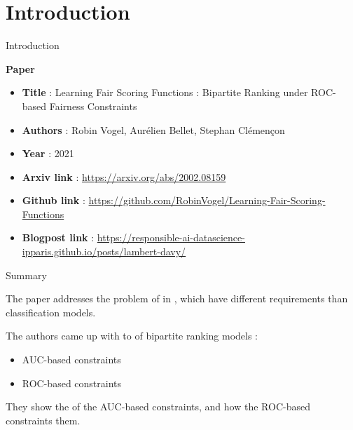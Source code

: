 \section{Introduction}
\begin{frame}{Introduction}



\begin{block}{\textbf{Paper}}
    \begin{itemize}
        \item \textbf{Title} : Learning Fair Scoring Functions : Bipartite Ranking under ROC-based Fairness Constraints
        \item \textbf{Authors} : Robin Vogel, Aurélien Bellet, Stephan Clémençon
        \item \textbf{Year} : 2021 
        \item \textbf{Arxiv link} : \url{https://arxiv.org/abs/2002.08159}
        \item \textbf{Github link} : \url{https://github.com/RobinVogel/Learning-Fair-Scoring-Functions}
        \item \textbf{Blogpost link} : \url{https://responsible-ai-datascience-ipparis.github.io/posts/lambert-davy/}
    \end{itemize}
\end{block}
    
\end{frame}


\begin{frame}{Summary}

    The paper addresses the problem of  in , which have different requirements than classification models.
    
    The authors came up with  to  of bipartite ranking models :
  \begin{itemize}
      \item AUC-based constraints
      \item ROC-based constraints
  \end{itemize}
  
  They show the  of the AUC-based constraints, and how the ROC-based constraints  them.
\end{frame}